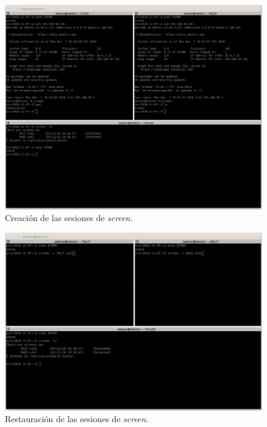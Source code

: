 \documentclass[a4paper,titlepage,12pt]{report}	%
\numberwithin{figure}{section} %
\numberwithin{table}{section} %
\begin{document}
	\begin{figure}[H]
		\centering
		\includegraphics[scale=0.29]{./Imagenes/P2/O1-1.png}
		\caption[Creación de las sesiones de \textit{screen}.]{Creación de las sesiones de \textit{screen}.}
		\label{P2-O1-1}
	\end{figure}

	\begin{figure}[H]
		\centering
		\includegraphics[scale=0.32]{./Imagenes/P2/O1-2.png}
		\caption[Restauración de las sesiones de \textit{screen}.]{Restauración de las sesiones de \textit{screen}.}
		\label{P2-O1-2}
	\end{figure}
\end{document}
